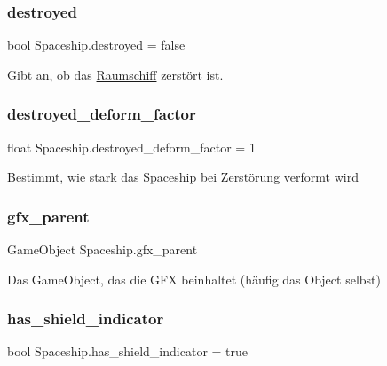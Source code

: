 \subsubsection{\texorpdfstring{destroyed}{destroyed}}
{\footnotesize\ttfamily bool Spaceship.\+destroyed = false}



Gibt an, ob das \hyperlink{class_raumschiff}{Raumschiff} zerstört ist. 

\mbox{\label{class_spaceship_ae434c25796c8b4522fcb41e3abda56d9}} 
\subsubsection{\texorpdfstring{destroyed\+\_\+deform\+\_\+factor}{destroyed\_deform\_factor}}
{\footnotesize\ttfamily float Spaceship.\+destroyed\+\_\+deform\+\_\+factor = 1}



Bestimmt, wie stark das \hyperlink{class_spaceship}{Spaceship} bei Zerstörung verformt wird 

\mbox{\label{class_spaceship_aa88ea0cfef593a18db011de1ca41c335}} 
\subsubsection{\texorpdfstring{gfx\+\_\+parent}{gfx\_parent}}
{\footnotesize\ttfamily Game\+Object Spaceship.\+gfx\+\_\+parent}



Das Game\+Object, das die G\+FX beinhaltet (häufig das Object selbst) 

\mbox{\label{class_spaceship_afe9aabc5e72224e51baf21791e026bd0}} 
\subsubsection{\texorpdfstring{has\+\_\+shield\+\_\+indicator}{has\_shield\_indicator}}
{\footnotesize\ttfamily bool Spaceship.\+has\+\_\+shield\+\_\+indicator = true}



